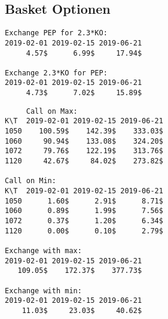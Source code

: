 \documentclass[a4paper,12pt]{article}
\numberwithin[\arabic]{Satz}{section}
\begin{document}
	\subsection*{Basket Optionen}
	
	
	
	
	
	
	
	
	
	
	
	
	
	
	
	
	
	
	


\begin{verbatim}
Exchange PEP for 2.3*KO:
2019-02-01 2019-02-15 2019-06-21
     4.57$      6.99$     17.94$ 

Exchange 2.3*KO for PEP:
2019-02-01 2019-02-15 2019-06-21
     4.73$      7.02$     15.89$
\end{verbatim}
     
\begin{verbatim}
     Call on Max:
K\T  2019-02-01 2019-02-15 2019-06-21
1050    100.59$    142.39$    333.03$ 
1060     90.94$    133.08$    324.20$ 
1072     79.76$    122.19$    313.76$ 
1120     42.67$     84.02$    273.82$ 

Call on Min:
K\T  2019-02-01 2019-02-15 2019-06-21
1050      1.60$      2.91$      8.71$ 
1060      0.89$      1.99$      7.56$ 
1072      0.37$      1.20$      6.34$ 
1120      0.00$      0.10$      2.79$ 

Exchange with max:
2019-02-01 2019-02-15 2019-06-21
   109.05$    172.37$    377.73$ 

Exchange with min:
2019-02-01 2019-02-15 2019-06-21
    11.03$     23.03$     40.62$ 
    \end{verbatim}
	
	
	
		
	
\end{document}
